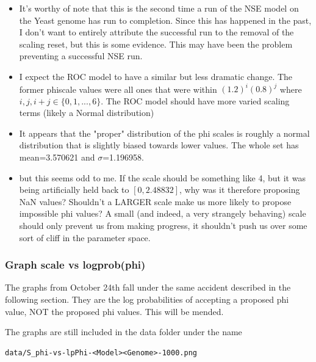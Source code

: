 \begin{itemize}
\item It's worthy of note that this is the second time a run of the NSE model on the Yeast genome has run to completion. Since this has happened in the past, I don't want to entirely attribute the successful run to the removal of the scaling reset, but this is some evidence. This may have been the problem preventing a successful NSE run.

\item I expect the ROC model to have a similar but less dramatic change. The former phiscale values were all ones that were within $(1.2)^i(0.8)^j$ where $i, j, i+j \in \{0, 1,...,6\}$. The ROC model should have more varied scaling terms (likely a Normal distribution)

\item It appears that the "proper" distribution of the phi scales is roughly a normal distribution that is slightly biased towards lower values. The whole set has mean=3.570621 and $\sigma$=1.196958.


\item but this seems odd to me. If the scale should be something like 4, but it was being artificially held back to $[0,2.48832]$, why was it therefore proposing NaN values? Shouldn't a LARGER scale make us more likely to propose impossible phi values? A small (and indeed, a very strangely behaving) scale should only prevent us from making progress, it shouldn't push us over some sort of cliff in the parameter space.
\end{itemize}


\subsubsection{Graph scale vs logprob(phi)}

The graphs from October 24th fall under the same accident described in the following section. They are the log probabilities of accepting a proposed phi value, NOT the proposed phi values.
This will be mended.

The graphs are still included in the data folder under the name 
\begin{verbatim}
data/S_phi-vs-lpPhi-<Model><Genome>-1000.png
\end{verbatim}





